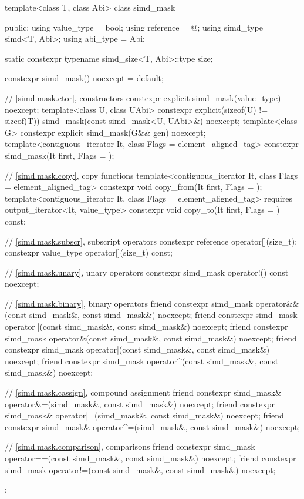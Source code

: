 \begin{codeblock}
template<class T, class Abi> class simd_mask {
public:
  using value_type = bool;
  using reference = @\seebelow@;
  using simd_type = simd<T, Abi>;
  using abi_type = Abi;

  static constexpr typename simd_size<T, Abi>::type size;

  constexpr simd_mask() noexcept = default;

  // \ref{simd.mask.ctor},  constructors
  constexpr explicit simd_mask(value_type) noexcept;
  template<class U, class UAbi>
    constexpr explicit(sizeof(U) != sizeof(T)) simd_mask(const simd_mask<U, UAbi>&) noexcept;
  template<class G> constexpr explicit simd_mask(G&& gen) noexcept;
  template<contiguous_iterator It, class Flags = element_aligned_tag>
    constexpr simd_mask(It first, Flags = {});

  // \ref{simd.mask.copy},  copy functions
  template<contiguous_iterator It, class Flags = element_aligned_tag>
    constexpr void copy_from(It first, Flags = {});
  template<contiguous_iterator It, class Flags = element_aligned_tag>
    requires output_iterator<It, value_type>
    constexpr void copy_to(It first, Flags = {}) const;

  // \ref{simd.mask.subscr},  subscript operators
  constexpr reference operator[](size_t);
  constexpr value_type operator[](size_t) const;

  // \ref{simd.mask.unary},  unary operators
  constexpr simd_mask operator!() const noexcept;

  // \ref{simd.mask.binary},  binary operators
  friend constexpr simd_mask operator&&(const simd_mask&, const simd_mask&) noexcept;
  friend constexpr simd_mask operator||(const simd_mask&, const simd_mask&) noexcept;
  friend constexpr simd_mask operator&(const simd_mask&, const simd_mask&) noexcept;
  friend constexpr simd_mask operator|(const simd_mask&, const simd_mask&) noexcept;
  friend constexpr simd_mask operator^(const simd_mask&, const simd_mask&) noexcept;

  // \ref{simd.mask.cassign},  compound assignment
  friend constexpr simd_mask& operator&=(simd_mask&, const simd_mask&) noexcept;
  friend constexpr simd_mask& operator|=(simd_mask&, const simd_mask&) noexcept;
  friend constexpr simd_mask& operator^=(simd_mask&, const simd_mask&) noexcept;

  // \ref{simd.mask.comparison},  comparisons
  friend constexpr simd_mask operator==(const simd_mask&, const simd_mask&) noexcept;
  friend constexpr simd_mask operator!=(const simd_mask&, const simd_mask&) noexcept;
};
\end{codeblock}


